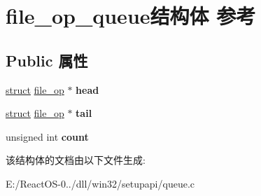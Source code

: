 \hypertarget{structfile__op__queue}{}\section{file\+\_\+op\+\_\+queue结构体 参考}
\label{structfile__op__queue}
\subsection*{Public 属性}
\begin{DoxyCompactItemize}
\item 
\mbox{\label{structfile__op__queue_a3e8a10805e2390b067b720e5ca7fff9d}} 
\hyperlink{interfacestruct}{struct} \hyperlink{structfile__op}{file\+\_\+op} $\ast$ {\bfseries head}
\item 
\mbox{\label{structfile__op__queue_ab3ce81f9b43f9b50f40d550269430cb2}} 
\hyperlink{interfacestruct}{struct} \hyperlink{structfile__op}{file\+\_\+op} $\ast$ {\bfseries tail}
\item 
\mbox{\label{structfile__op__queue_a138959220cfcc6e298cdbbd9e2dc8cd3}} 
unsigned int {\bfseries count}
\end{DoxyCompactItemize}


该结构体的文档由以下文件生成\+:\begin{DoxyCompactItemize}
\item 
E\+:/\+React\+O\+S-\/0../dll/win32/setupapi/queue.\+c\end{DoxyCompactItemize}
